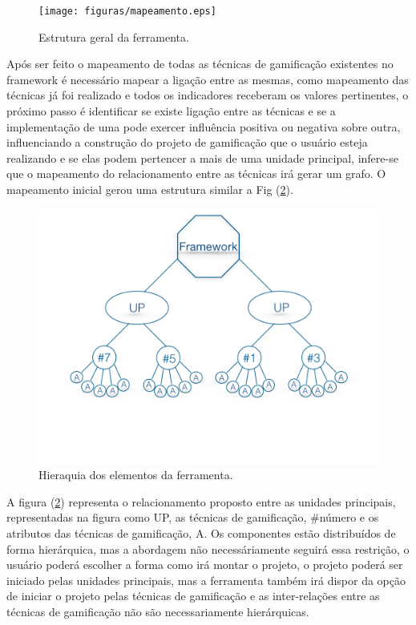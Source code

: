 \begin{figure}[h]
	\centering
		\texttt{[image: figuras/mapeamento.eps]}
	\caption{Estrutura geral da ferramenta.\label{fig03}
}
\end{figure}
\newpage


Após ser feito o mapeamento de todas as técnicas de gamificação existentes no framework é necessário mapear a ligação entre as mesmas, como mapeamento das técnicas já foi realizado e todos os indicadores receberam os valores pertinentes, o próximo passo é identificar se existe ligação entre as técnicas e se a implementação de uma pode exercer influência positiva ou negativa sobre outra, influenciando a construção do projeto de gamificação que o usuário esteja realizando e se elas podem pertencer a mais de uma unidade principal, infere-se que o mapeamento do relacionamento entre as técnicas irá gerar um grafo. O mapeamento inicial gerou uma estrutura similar a Fig (\ref{fig04}).

\begin{figure}[h]
	\centering
		\includegraphics[keepaspectratio=true,scale=0.5]{figuras/heranca.png}
	\caption{Hieraquia dos elementos da ferramenta.	\label{fig04}}
\end{figure}

\newpage

A figura (\ref{fig04}) representa o relacionamento proposto entre as unidades principais, representadas na figura como UP, as técnicas de gamificação, \#número e os atributos das técnicas de gamificação, A. Os componentes estão distribuídos de forma hierárquica, mas a abordagem não necessáriamente seguirá essa restrição, o usuário poderá escolher a forma como irá montar o projeto, o projeto poderá ser iniciado pelas unidades principais, mas a ferramenta também irá dispor da opção de iniciar o projeto pelas técnicas de gamificação e as inter-relações entre as técnicas de gamificação não são necessariamente hierárquicas.

